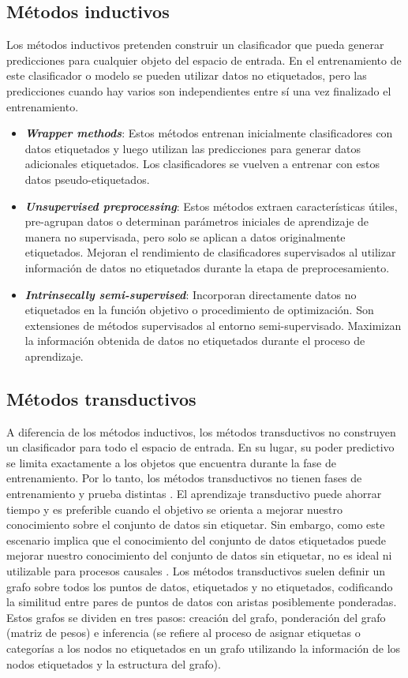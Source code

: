 \subsection{Métodos inductivos}
Los métodos inductivos pretenden construir un clasificador que pueda generar predicciones para cualquier objeto del espacio de entrada. En el entrenamiento de este clasificador o modelo se pueden utilizar datos no etiquetados, pero las predicciones cuando hay varios son independientes entre sí una vez finalizado el entrenamiento.
\begin{itemize}
	\item \textbf{\textit{Wrapper methods}}: Estos métodos entrenan inicialmente clasificadores con datos etiquetados y luego utilizan las predicciones para generar datos adicionales etiquetados. Los clasificadores se vuelven a entrenar con estos datos pseudo-etiquetados.
	\item \textbf{\textit{Unsupervised preprocessing}}: Estos métodos extraen características útiles, pre-agrupan datos o determinan parámetros iniciales de aprendizaje de manera no supervisada, pero solo se aplican a datos originalmente etiquetados. Mejoran el rendimiento de clasificadores supervisados al utilizar información de datos no etiquetados durante la etapa de preprocesamiento.
	\item \textbf{\textit{Intrinsecally semi-supervised}}: Incorporan directamente datos no etiquetados en la función objetivo o procedimiento de optimización. Son extensiones de métodos supervisados al entorno semi-supervisado. Maximizan la información obtenida de datos no etiquetados durante el proceso de aprendizaje.
	
\end{itemize}
\subsection{Métodos transductivos} %
A diferencia de los métodos inductivos, los métodos transductivos no construyen un clasificador para todo el espacio de entrada. En su lugar, su poder predictivo se limita exactamente a los objetos que encuentra durante la fase de entrenamiento. Por lo tanto, los métodos transductivos no tienen fases de entrenamiento y prueba distintas \cite{Engelen:semi-supervised}.
El aprendizaje transductivo puede ahorrar tiempo y es preferible cuando el objetivo se orienta a mejorar nuestro conocimiento sobre el conjunto de datos sin etiquetar. Sin embargo, como este escenario implica que el conocimiento del conjunto de datos etiquetados puede mejorar nuestro conocimiento del conjunto de datos sin etiquetar, no es ideal ni utilizable para procesos causales \cite{web:assumptions}.
Los métodos transductivos suelen definir un grafo sobre todos los puntos de datos, etiquetados y no etiquetados, codificando la similitud entre pares de puntos de datos con aristas posiblemente ponderadas. Estos grafos se dividen en tres pasos: creación del grafo, ponderación del grafo (matriz de pesos) e inferencia (se refiere al proceso de asignar etiquetas o categorías a los nodos no etiquetados en un grafo utilizando la información de los nodos etiquetados y la estructura del grafo).
